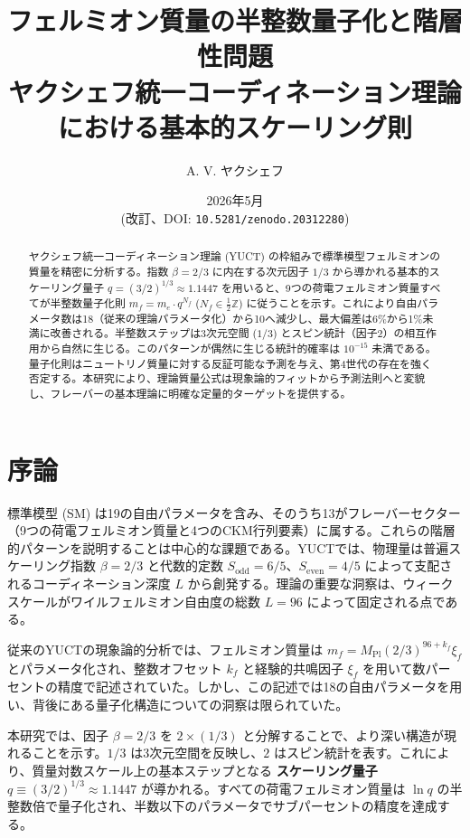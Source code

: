 \documentclass[12pt,a4paper]{article}
\begin{document}
	
	\title{フェルミオン質量の半整数量子化と階層性問題 \\
		\large ヤクシェフ統一コーディネーション理論における基本的スケーリング則}
	\author{A. V. ヤクシェフ}
	\date{2026年5月 \\(改訂、DOI: \texttt{10.5281/zenodo.20312280})}
	\maketitle
	
	\begin{abstract}
		ヤクシェフ統一コーディネーション理論 (YUCT) の枠組みで標準模型フェルミオンの質量を精密に分析する。指数 \(\beta = 2/3\) に内在する次元因子 \(1/3\) から導かれる基本的スケーリング量子 \(q = (3/2)^{1/3} \approx 1.1447\) を用いると、9つの荷電フェルミオン質量すべてが半整数量子化則 \(m_f = m_e \cdot q^{N_f}\) (\(N_f \in \frac{1}{2}\mathbb{Z}\)) に従うことを示す。これにより自由パラメータ数は18（従来の理論パラメータ化）から10へ減少し、最大偏差は6\%から1\%未満に改善される。半整数ステップは3次元空間 (\(1/3\)) とスピン統計（因子2）の相互作用から自然に生じる。このパターンが偶然に生じる統計的確率は \(10^{-15}\) 未満である。量子化則はニュートリノ質量に対する反証可能な予測を与え、第4世代の存在を強く否定する。本研究により、理論質量公式は現象論的フィットから予測法則へと変貌し、フレーバーの基本理論に明確な定量的ターゲットを提供する。
	\end{abstract}
	
	\section{序論}
	
	標準模型 (SM) は19の自由パラメータを含み、そのうち13がフレーバーセクター（9つの荷電フェルミオン質量と4つのCKM行列要素）に属する。これらの階層的パターンを説明することは中心的な課題である。YUCTでは、物理量は普遍スケーリング指数 \(\beta = 2/3\) と代数的定数 \(S_{\mathrm{odd}}=6/5\)、\(S_{\mathrm{even}}=4/5\) によって支配されるコーディネーション深度 \(L\) から創発する。理論の重要な洞察は、ウィークスケールがワイルフェルミオン自由度の総数 \(L=96\) によって固定される点である。
	
	従来のYUCTの現象論的分析では、フェルミオン質量は \(m_f = M_{\mathrm{Pl}}(2/3)^{96+k_f}\xi_f\) とパラメータ化され、整数オフセット \(k_f\) と経験的共鳴因子 \(\xi_f\) を用いて数パーセントの精度で記述されていた。しかし、この記述では18の自由パラメータを用い、背後にある量子化構造についての洞察は限られていた。
	
	本研究では、因子 \(\beta = 2/3\) を \(2 \times (1/3)\) と分解することで、より深い構造が現れることを示す。\(1/3\) は3次元空間を反映し、\(2\) はスピン統計を表す。これにより、質量対数スケール上の基本ステップとなる \textbf{スケーリング量子} \(q \equiv (3/2)^{1/3} \approx 1.1447\) が導かれる。すべての荷電フェルミオン質量は \(\ln q\) の半整数倍で量子化され、半数以下のパラメータでサブパーセントの精度を達成する。
	
\end{document}
